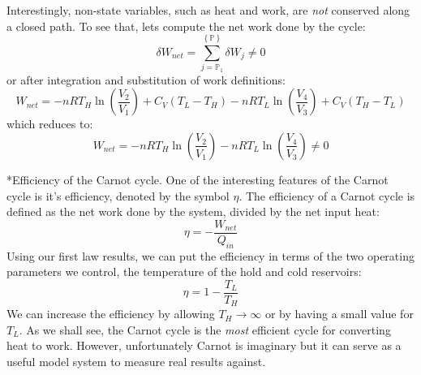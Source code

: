 \documentclass[11pt]{article}
\makeatletter
\theoremstyle{definition}
\renewcommand\subsection{\@startsection
	{subsection}{2}{0mm}
	{-0.05in}
	{-0.5\baselineskip}
	{\normalfont\normalsize\bfseries}}
\makeatother
\begin{document}
Interestingly, non-state variables, such as heat and work, are \textit{not} conserved along a closed path. To see that, lets compute the
net work done by the cycle:
\begin{equation}
\delta{W}_{net} = \sum_{j=\mathbb{P}_{1}}^{\left\{\mathbb{P}\right\}}\delta{W}_j\neq 0
\end{equation}or after integration and substitution of work definitions:
\begin{equation}
W_{net} = - nRT_{H}\ln\left(\frac{V_{2}}{V_{1}}\right) + C_{V}\left(T_{L} - T_{H}\right) - nRT_{L}\ln\left(\frac{V_{4}}{V_{3}}\right) + C_{V}\left(T_{H} - T_{L}\right)
\end{equation}which reduces to:
\begin{equation}
W_{net} = - nRT_{H}\ln\left(\frac{V_{2}}{V_{1}}\right) - nRT_{L}\ln\left(\frac{V_{4}}{V_{3}}\right) \neq{0}
\end{equation}

\subsection*{Efficiency of the Carnot cycle.}
One of the interesting features of the Carnot cycle is it's efficiency, denoted by the symbol $\eta$.
The efficiency of a Carnot cycle is defined as the net work done by the system, divided by the net input heat:
\begin{equation}
\eta = -\frac{W_{net}}{Q_{in}}
\end{equation}Using our first law results, we can put the efficiency in terms of the two operating parameters we control, the temperature of the
hold and cold reservoirs:
\begin{equation}\label{eqn:carnot-efficinecy}
\eta = 1 - \frac{T_{L}}{T_{H}}
\end{equation}We can increase the efficiency by allowing $T_{H}\rightarrow\infty$ or by having a small value for $T_{L}$.
As we shall see, the Carnot cycle is the \textit{most} efficient cycle for converting heat to work.
However, unfortunately Carnot is imaginary but it can serve as a useful model system to measure real results against.



\end{document}
